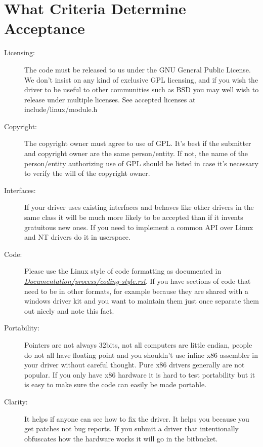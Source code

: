 \documentclass[a4paper,8pt,english]{sphinxmanual}
\begin{document}
\section{What Criteria Determine Acceptance}
\label{process/submitting-drivers:what-criteria-determine-acceptance}\begin{description}
\item[{Licensing:}] \leavevmode
The code must be released to us under the
GNU General Public License. We don't insist on any kind
of exclusive GPL licensing, and if you wish the driver
to be useful to other communities such as BSD you may well
wish to release under multiple licenses.
See accepted licenses at include/linux/module.h

\item[{Copyright:}] \leavevmode
The copyright owner must agree to use of GPL.
It's best if the submitter and copyright owner
are the same person/entity. If not, the name of
the person/entity authorizing use of GPL should be
listed in case it's necessary to verify the will of
the copyright owner.

\item[{Interfaces:}] \leavevmode
If your driver uses existing interfaces and behaves like
other drivers in the same class it will be much more likely
to be accepted than if it invents gratuitous new ones.
If you need to implement a common API over Linux and NT
drivers do it in userspace.

\item[{Code:}] \leavevmode
Please use the Linux style of code formatting as documented
in {\hyperref[process/coding\string-style:codingstyle]{\emph{Documentation/process/coding-style.rst}}}.
If you have sections of code
that need to be in other formats, for example because they
are shared with a windows driver kit and you want to
maintain them just once separate them out nicely and note
this fact.

\item[{Portability:}] \leavevmode
Pointers are not always 32bits, not all computers are little
endian, people do not all have floating point and you
shouldn't use inline x86 assembler in your driver without
careful thought. Pure x86 drivers generally are not popular.
If you only have x86 hardware it is hard to test portability
but it is easy to make sure the code can easily be made
portable.

\item[{Clarity:}] \leavevmode
It helps if anyone can see how to fix the driver. It helps
you because you get patches not bug reports. If you submit a
driver that intentionally obfuscates how the hardware works
it will go in the bitbucket.


\end{description}
\end{document}
